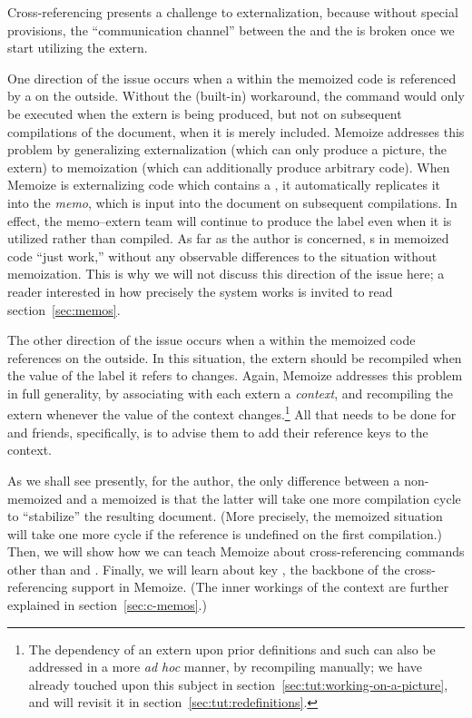 \documentclass[a4paper,11pt]{article}
\begin{document}
Cross-referencing presents a challenge to externalization, because without
special provisions, the ``communication channel'' between the  and the
 is broken once we start utilizing the extern.

One direction of the issue occurs when a  within the memoized
code is referenced by a  on the outside.  Without the (built-in)
workaround, the  command would only be executed when the extern is
being produced, but not on subsequent compilations of the document, when it is
merely included.  Memoize addresses this problem by generalizing
externalization (which can only produce a picture, the extern) to memoization
(which can additionally produce arbitrary code).  When Memoize is externalizing
code which contains a , it automatically replicates it into the
\emph{memo}, which is input into the document on subsequent compilations. In
effect, the memo--extern team will continue to produce the label even when it
is utilized rather than compiled.  As far as the author is concerned, s
in memoized code ``just work,'' without any observable differences to the
situation without memoization.  This is why we will not discuss this direction
of the issue here; a reader interested in how precisely the system works is
invited to read section~\ref{sec:memos}.

The other direction of the issue occurs when a  within the memoized
code references  on the outside.  In this situation, the extern
should be recompiled when the value of the label it refers to changes.  Again,
Memoize addresses this problem in full generality, by associating with each
extern a \emph{context}, and recompiling the extern whenever the value of the
context changes.\footnote{The dependency of an extern upon prior definitions
  and such can also be addressed in a more \emph{ad hoc} manner, by recompiling
  manually; we have already touched upon this subject in
  section~\ref{sec:tut:working-on-a-picture}, and will revisit it in
  section~\ref{sec:tut:redefinitions}.}  All that needs to be done for 
and friends, specifically, is to advise them to add their reference keys to the
context.

As we shall see presently, for the author, the only difference between a
non-memoized and a memoized  is that the latter will take one more
compilation cycle to ``stabilize'' the resulting document.  (More precisely,
the memoized situation will take one more cycle if the reference is undefined
on the first compilation.)  Then, we will show how we can teach Memoize about
cross-referencing commands other than  and .  Finally, we will
learn about key , the backbone of the cross-referencing support
in Memoize.  (The inner workings of the context are further explained in
section~\ref{sec:c-memos}.)
\end{document}
